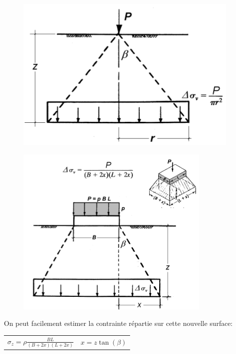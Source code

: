             \begin{multicols}{2}
            
                \begin{figure}[h!]
                \center
                \includegraphics[scale=0.6]{Holeyman/images/H26.PNG}
                \end{figure}
            
            \vfill\null\columnbreak
            
                \begin{figure}[h!]
                \includegraphics[scale=0.6]{Holeyman/images/H27.PNG}
                \end{figure}
                
            \end{multicols}
            
            On peut facilement estimer la contrainte répartie sur cette nouvelle surface: 
            
            \begin{center}
            \begin{tabular}{c|c}
                $\sigma_z = \rho \frac{BL}{(B+2x)(L+2x)}$ \: \: &  $ x = z \tan(\beta) $ 
            \end{tabular}
            \end{center} 
            
